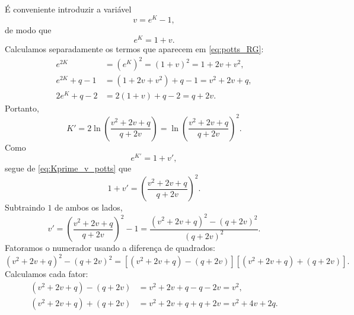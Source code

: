 \documentclass[12pt,a4paper]{article}
\begin{document}
%
É conveniente introduzir a variável
%
\begin{equation}
    v=e^{K}-1,
    \label{eq:v_def_potts}
\end{equation}
%
de modo que
%
\begin{equation}
    e^{K}=1+v.
\end{equation}
%
Calculamos separadamente os termos que aparecem em \eqref{eq:potts_RG}:
%
\begin{align}
    e^{2K}
    &=
    (e^{K})^2
    =
    (1+v)^2
    =
    1+2v+v^2,
    \label{eq:e2K_potts}
    \\[4pt]
    e^{2K}+q-1
    &=
    (1+2v+v^2)+q-1
    =
    v^2+2v+q,
    \label{eq:num_potts}
    \\[4pt]
    2e^{K}+q-2
    &=
    2(1+v)+q-2
    =
    q+2v.
    \label{eq:den_potts}
\end{align}
%
Portanto,
%
\begin{equation}
    K'
    =
    2\ln
    \left(
        \frac{v^2+2v+q}{q+2v}
    \right)
    =
    \ln
    \left(
        \frac{v^2+2v+q}{q+2v}
    \right)^2.
    \label{eq:Kprime_v_potts}
\end{equation}
%
Como
%
\begin{equation}
    e^{K'}=1+v',
\end{equation}
%
segue de \eqref{eq:Kprime_v_potts} que
%
\begin{equation}
    1+v'
    =
    \left(
        \frac{v^2+2v+q}{q+2v}
    \right)^2.
    \label{eq:1vprime_potts}
\end{equation}
%
Subtraindo \(1\) de ambos os lados,
%
\begin{equation}
    v'
    =
    \left(
        \frac{v^2+2v+q}{q+2v}
    \right)^2
    -
    1
    =
    \frac{
        (v^2+2v+q)^2-(q+2v)^2
    }{(q+2v)^2}.
    \label{eq:vprime_unsimplified_potts}
\end{equation}
%
Fatoramos o numerador usando a diferença de quadrados:
%
\begin{equation}
    (v^2+2v+q)^2-(q+2v)^2
    =
    \left[
        (v^2+2v+q)-(q+2v)
    \right]
    \left[
        (v^2+2v+q)+(q+2v)
    \right].
    \label{eq:diff_squares_potts}
\end{equation}
%
Calculamos cada fator:
%
\begin{align}
    (v^2+2v+q)-(q+2v)
    &=
    v^2+2v+q-q-2v
    =
    v^2,
    \label{eq:fator1_potts}
    \\[4pt]
    (v^2+2v+q)+(q+2v)
    &=
    v^2+2v+q+q+2v
    =
    v^2+4v+2q.
    \label{eq:fator2_potts}
\end{align}
\end{document}
